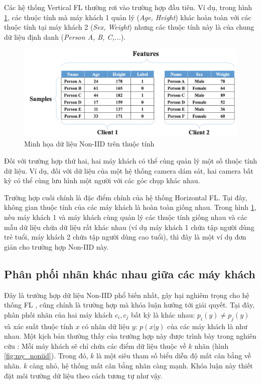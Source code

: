 Các hệ thống Vertical FL thường rơi vào trường hợp đầu tiên. Ví dụ, trong hình \ref{fig:vertical_fl}, các thuộc tính mà máy khách 1 quản lý (\textit{Age, Height}) khác hoàn toàn với các thuộc tính tại máy khách 2 (\textit{Sex, Weight}) nhưng các thuộc tính này là của chung dữ liệu định danh (\textit{Person A, B, C,...}).

\begin{figure}[H]
    \centering
    \includegraphics[scale=0.6]{../images/vertical_fl.png}
    \caption{Minh họa dữ liệu Non-IID trên thuộc tính \cite{zhu2021federated}}
    \label{fig:vertical_fl}
\end{figure}

Đối với trường hợp thứ hai, hai máy khách có thể cùng quản lý một số thuộc tính dữ liệu. Ví dụ, đối với dữ liệu của một hệ thống camera dám sát, hai camera bất kỳ có thể cùng lưu hình một người với các góc chụp khác nhau.

Trường hợp cuối chính là đặc điểm chính của hệ thống Horizontal FL. Tại đây, không gian thuộc tính của các máy khách là hoàn toàn giống nhau. Trong hình \ref{fig:vertical_fl}, nếu máy khách 1 và máy khách cùng quản lý các thuộc tính giống nhau và các mẫu dữ liệu chứa dữ liệu rất khác nhau (ví dụ máy khách 1 chứa tập người dùng trẻ tuổi, máy khách 2 chứa tập người dùng cao tuổi), thì đây là một ví dụ đơn giản cho trường hợp Non-IID này.

\subsection{Phân phối nhãn khác nhau giữa các máy khách}

Đây là trường hợp dữ liệu Non-IID phổ biến nhất, gây hại nghiêm trọng cho hệ thống FL \cite{zhu2021federated}, cũng chính là trường hợp mà khóa luận hướng tới giải quyết. Tại đây, phân phối nhãn của hai máy khách $c_i, c_j$ bất kỳ là khác nhau: $p_i(y) \ne p_j(y)$ và xác suất thuộc tính $x$ có nhãn dữ liệu $y$: $p(x|y)$ của các máy khách là như nhau. Một kịch bản thường thấy của trường hợp này được trình bày trong nghiên cứu \cite{mcmahan2017communication}: Mỗi máy khách sẽ chỉ chứa các điểm dữ liệu thuộc về $k$ nhãn (hình \ref{fig:my_noniid}). Trong đó, $k$ là một siêu tham số biểu diễn độ mất cân bằng về nhãn. $k$ càng nhỏ, hệ thống mất cân bằng nhãn càng mạnh. Khóa luận này thiết đặt môi trường dữ liệu theo cách tương tự như vậy.

